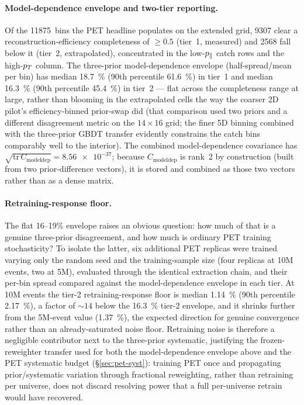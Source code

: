 \paragraph{Model-dependence envelope and two-tier reporting.}
Of the \num{11875}~bins the PET headline populates on the extended grid,
\num{9307} clear a reconstruction-efficiency completeness of $\ge0.5$
(tier~1, measured) and \num{2568} fall below it (tier~2, extrapolated),
concentrated in the low-$p_{\parallel}$ catch rows and the high-$p_{T}$ column. The
three-prior model-dependence envelope (half-spread/mean per bin) has median
\SI{18.7}{\percent} (90th percentile \SI{61.6}{\percent}) in tier~1 and
median \SI{16.3}{\percent} (90th percentile \SI{45.4}{\percent}) in tier~2
--- flat across the completeness range at large, rather than blooming in the
extrapolated cells the way the coarser 2D pilot's efficiency-binned
prior-swap did (that comparison used two priors and a different disagreement
metric on the $14\times16$ grid; the finer 5D binning combined with the
three-prior GBDT transfer evidently constrains the catch bins comparably well
to the interior). The combined model-dependence covariance has
$\sqrt{\mathrm{tr}\,C_{\text{modeldep}}} = \num{8.56e-37}$; because
$C_{\text{modeldep}}$ is rank~2 by construction (built from two
prior-difference vectors), it is stored and combined as those two vectors
rather than as a dense matrix.

\paragraph{Retraining-response floor.}
The flat 16--19\% envelope raises an obvious question: how much of that is a
genuine three-prior disagreement, and how much is ordinary PET training
stochasticity? To isolate the latter, six additional PET replicas were
trained varying only the random seed and the training-sample size (four
replicas at 10M events, two at 5M), evaluated through the identical
extraction chain, and their per-bin spread compared against the
model-dependence envelope in each tier. At 10M events the tier-2
retraining-response floor is median \SI{1.14}{\percent} (90th percentile
\SI{2.17}{\percent}), a factor of $\sim14$ below the \SI{16.3}{\percent}
tier-2 envelope, and it shrinks further from the 5M-event value
(\SI{1.37}{\percent}), the expected direction for genuine convergence rather
than an already-saturated noise floor. Retraining noise is therefore a
negligible contributor next to the three-prior systematic, justifying the
frozen-reweighter transfer used for both the model-dependence envelope above
and the PET systematic budget (\S\ref{sec:pet-syst}): training PET once and
propagating prior/systematic variation through fractional reweighting, rather
than retraining per universe, does not discard resolving power that a full
per-universe retrain would have recovered.
